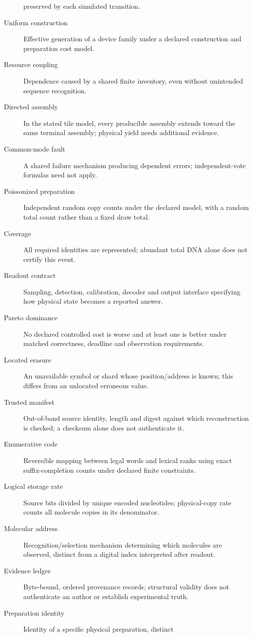 \begin{description}
preserved by each simulated transition.
\item[Uniform construction] Effective generation of a device family under a
declared construction and preparation cost model.
\item[Resource coupling] Dependence caused by a shared finite inventory, even
without unintended sequence recognition.
\item[Directed assembly] In the stated tile model, every producible assembly
extends toward the same terminal assembly; physical yield needs additional evidence.
\item[Common-mode fault] A shared failure mechanism producing dependent errors;
independent-vote formulas need not apply.
\item[Poissonized preparation] Independent random copy counts under the declared
model, with a random total count rather than a fixed draw total.
\item[Coverage] All required identities are represented; abundant total DNA
alone does not certify this event.
\item[Readout contract] Sampling, detection, calibration, decoder and output
interface specifying how physical state becomes a reported answer.
\item[Pareto dominance] No declared controlled cost is worse and at least one
is better under matched correctness, deadline and observation requirements.
\item[Located erasure] An unavailable symbol or shard whose position/address is
known; this differs from an unlocated erroneous value.
\item[Trusted manifest] Out-of-band source identity, length and digest against
which reconstruction is checked; a checksum alone does not authenticate it.
\item[Enumerative code] Reversible mapping between legal words and lexical ranks
using exact suffix-completion counts under declared finite constraints.
\item[Logical storage rate] Source bits divided by unique encoded nucleotides;
physical-copy rate counts all molecule copies in its denominator.
\item[Molecular address] Recognition/selection mechanism determining which
molecules are observed, distinct from a digital index interpreted after readout.
\item[Evidence ledger] Byte-bound, ordered provenance records; structural validity
does not authenticate an author or establish experimental truth.
\item[Preparation identity] Identity of a specific physical preparation, distinct

\end{description}
